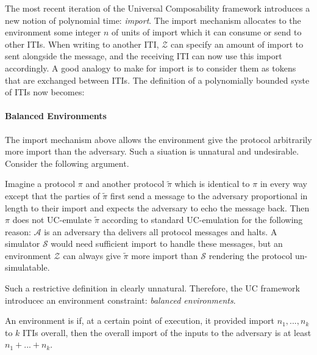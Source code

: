 The most recent iteration of the Universal Composability framework introduces a new notion of polynomial time: \textit{import}.
The import mechanism allocates to the environment some integer $n$ of units of import which it can consume or send to other ITIs.
When writing to another ITI, $\mathcal{Z}$ can specify an amount of import to sent alongside the message, and the receiving ITI can now use this import accordingly.
A good analogy to make for import is to consider them as tokens that are exchanged between ITIs. 
The definition of a polynomially bounded syste of ITIs now becomes: 


\paragraph{Balanced Environments}
The import mechanism above allows the environment give the protocol arbitrarily more import than the adversary.
Such a siuation is unnatural and undesirable. Consider the following argument.

Imagine a protocol $\pi$ and another protocol $\widetilde{\pi}$ which is identical to $\pi$ in every way except that the parties of $\widetilde{\pi}$ first send a message to the adversary proportional in length to their import and expects the adversary to echo the message back. 
Then $\pi$ does not UC-emulate $\widetilde{\pi}$ according to standard UC-emulation for the following reason: $\mathcal{A}$ is an adversary tha delivers all protocol messages and halts. A simulator $\mathcal{S}$ would need sufficient import to handle these messages, but an environment $\mathcal{Z}$ can always give $\widetilde{\pi}$ more import than $\mathcal{S}$ rendering the protocol un-simulatable. 

Such a restrictive definition in clearly unnatural. Therefore, the UC framework introducec an environment constraint: \textit{balanced environments}.

\begin{definition} \label{def:balancedenvironments}
An environment is  if, at a certain point of execution, it provided import $n_1,...,n_k$ to $k$ ITIs overall, then the overall import of the inputs to the adversary is at least $n_1 + ... + n_k$.
\end{definition}
